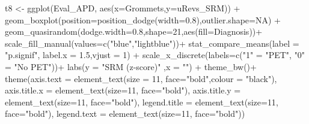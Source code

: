 \documentclass[a4paper, twoside]{templates/ociamthesis}
\newenvironment{Shaded}{\begin{snugshade}}{\end{snugshade}}
\newcommand{\AttributeTok}[1]{\textcolor[rgb]{0.77,0.63,0.00}{#1}}
\newcommand{\ConstantTok}[1]{\textcolor[rgb]{0.00,0.00,0.00}{#1}}
\newcommand{\DecValTok}[1]{\textcolor[rgb]{0.00,0.00,0.81}{#1}}
\newcommand{\FloatTok}[1]{\textcolor[rgb]{0.00,0.00,0.81}{#1}}
\newcommand{\FunctionTok}[1]{\textcolor[rgb]{0.00,0.00,0.00}{#1}}
\newcommand{\NormalTok}[1]{#1}
\newcommand{\OtherTok}[1]{\textcolor[rgb]{0.56,0.35,0.01}{#1}}
\newcommand{\SpecialCharTok}[1]{\textcolor[rgb]{0.00,0.00,0.00}{#1}}
\newcommand{\StringTok}[1]{\textcolor[rgb]{0.31,0.60,0.02}{#1}}
\renewenvironment{Shaded}
{
  \vspace{4pt}%
  \begin{snugshade}%
}{%
  \end{snugshade}%
  \vspace{4pt}%
}
\begin{document}
\begin{Shaded}
\begin{Highlighting}[]
\NormalTok{t8 }\OtherTok{\textless{}{-}} \FunctionTok{ggplot}\NormalTok{(Eval\_APD, }\FunctionTok{aes}\NormalTok{(}\AttributeTok{x=}\NormalTok{Grommets,}\AttributeTok{y=}\NormalTok{uRevs\_SRM)) }\SpecialCharTok{+}
    \FunctionTok{geom\_boxplot}\NormalTok{(}\AttributeTok{position=}\FunctionTok{position\_dodge}\NormalTok{(}\AttributeTok{width=}\FloatTok{0.8}\NormalTok{),}\AttributeTok{outlier.shape=}\ConstantTok{NA}\NormalTok{) }\SpecialCharTok{+} 
  \FunctionTok{geom\_quasirandom}\NormalTok{(}\AttributeTok{dodge.width=}\FloatTok{0.8}\NormalTok{,}\AttributeTok{shape=}\DecValTok{21}\NormalTok{,}\FunctionTok{aes}\NormalTok{(}\AttributeTok{fill=}\NormalTok{Diagnosis))}\SpecialCharTok{+}
  \FunctionTok{scale\_fill\_manual}\NormalTok{(}\AttributeTok{values=}\FunctionTok{c}\NormalTok{(}\StringTok{"blue"}\NormalTok{,}\StringTok{"lightblue"}\NormalTok{))}\SpecialCharTok{+}
  \FunctionTok{stat\_compare\_means}\NormalTok{(}\AttributeTok{label =}  \StringTok{"p.signif"}\NormalTok{, }\AttributeTok{label.x =} \FloatTok{1.5}\NormalTok{,}\AttributeTok{vjust =} \DecValTok{1}\NormalTok{) }\SpecialCharTok{+}  
  \FunctionTok{scale\_x\_discrete}\NormalTok{(}\AttributeTok{labels=}\FunctionTok{c}\NormalTok{(}\StringTok{"1"} \OtherTok{=} \StringTok{"PET"}\NormalTok{, }\StringTok{"0"} \OtherTok{=} \StringTok{"No PET"}\NormalTok{))}\SpecialCharTok{+}
  \FunctionTok{labs}\NormalTok{(}\AttributeTok{y =} \StringTok{"SRM (z{-}score)"}\NormalTok{ ,}\AttributeTok{x =} \StringTok{""}\NormalTok{) }\SpecialCharTok{+}
  \FunctionTok{theme\_bw}\NormalTok{()}\SpecialCharTok{+}
  \FunctionTok{theme}\NormalTok{(}\AttributeTok{axis.text =} \FunctionTok{element\_text}\NormalTok{(}\AttributeTok{size =} \DecValTok{11}\NormalTok{, }\AttributeTok{face=}\StringTok{"bold"}\NormalTok{,}\AttributeTok{colour =} \StringTok{"black"}\NormalTok{),}
        \AttributeTok{axis.title.x =} \FunctionTok{element\_text}\NormalTok{(}\AttributeTok{size=}\DecValTok{11}\NormalTok{, }\AttributeTok{face=}\StringTok{"bold"}\NormalTok{),}
        \AttributeTok{axis.title.y =} \FunctionTok{element\_text}\NormalTok{(}\AttributeTok{size=}\DecValTok{11}\NormalTok{, }\AttributeTok{face=}\StringTok{"bold"}\NormalTok{),}
        \AttributeTok{legend.title =} \FunctionTok{element\_text}\NormalTok{(}\AttributeTok{size=}\DecValTok{11}\NormalTok{, }\AttributeTok{face=}\StringTok{"bold"}\NormalTok{),}
        \AttributeTok{legend.text  =} \FunctionTok{element\_text}\NormalTok{(}\AttributeTok{size=}\DecValTok{11}\NormalTok{, }\AttributeTok{face=}\StringTok{"bold"}\NormalTok{))}


\end{Highlighting}
\end{Shaded}
\end{document}

